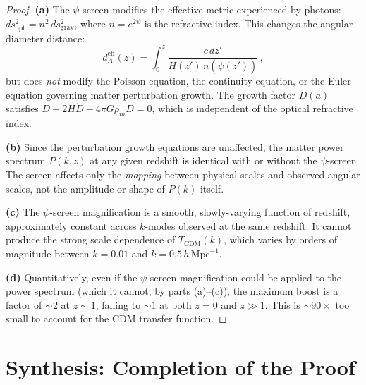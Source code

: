 \documentclass[12pt,a4paper]{article}
\newcommand{\hMpc}{\,h\,\mathrm{Mpc}^{-1}}
\begin{document}
\begin{proof}
\textbf{(a)} The $\psi$-screen modifies the effective metric experienced
by photons: $ds^2_{\mathrm{opt}} = n^2\,ds^2_{\mathrm{grav}}$, where
$n = e^{2\psi}$ is the refractive index. This changes the
angular diameter distance:
\begin{equation}
d_A^{\mathrm{eff}}(z) = \int_0^z \frac{c\,dz'}{H(z')\,n(\bar{\psi}(z'))}\,,
\end{equation}
but does \emph{not} modify the Poisson equation, the continuity
equation, or the Euler equation governing matter perturbation growth.
The growth factor $D(a)$ satisfies
$\ddot{D} + 2H\dot{D} - 4\pi G\rho_m D = 0$, which is independent
of the optical refractive index.

\textbf{(b)} Since the perturbation growth equations are unaffected,
the matter power spectrum $P(k,z)$ at any given redshift is identical
with or without the $\psi$-screen. The screen affects only the
\emph{mapping} between physical scales and observed angular scales,
not the amplitude or shape of $P(k)$ itself.

\textbf{(c)} The $\psi$-screen magnification is a smooth, slowly-varying
function of redshift, approximately constant across $k$-modes observed
at the same redshift. It cannot produce the strong scale dependence
of $T_{\mathrm{CDM}}(k)$, which varies by orders of magnitude between
$k = 0.01$ and $k = 0.5\hMpc$.

\textbf{(d)} Quantitatively, even if the $\psi$-screen magnification
could be applied to the power spectrum (which it cannot, by parts
(a)--(c)), the maximum boost is a factor of $\sim 2$ at $z \sim 1$,
falling to $\sim 1$ at both $z = 0$ and $z \gg 1$. This is $\sim 90\times$
too small to account for the CDM transfer function.
\end{proof}

\section{Synthesis: Completion of the Proof}
\label{sec:synthesis}
\end{document}
